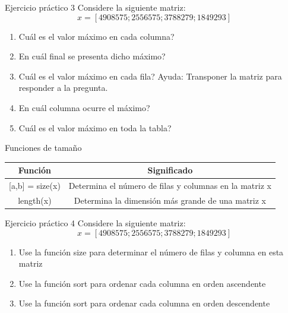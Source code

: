 \documentclass{bredelebeamer}
\begin{document}
\begin{frame}{Ejercicio práctico 3}
Considere la siguiente matriz:
\begin{equation*}
x = [4 90 85 75 ; 2 55 65 75 ; 3 78 82 79 ; 1 84 92 93]
\end{equation*}
\begin{enumerate}
\item Cuál es el valor máximo en cada columna?
\item En cuál final se presenta dicho máximo?
\item Cuál es el valor máximo en cada fila? Ayuda: Transponer la matriz para responder a la pregunta.
\item En cuál columna ocurre el máximo?
\item Cuál es el valor máximo en toda la tabla?
\end{enumerate}
\end{frame}

\begin{frame}{Funciones de tamaño}
\begin{table}[]
\centering
\begin{tabular}{|c|c|}
\hline
Función             & Significado                                            \\ \hline
{[}a,b{]} = size(x) & Determina el número de filas y columnas en la matriz x \\ \hline
length(x)           & Determina la dimensión más grande de una matriz x      \\ \hline
\end{tabular}
\end{table}
\end{frame}

\begin{frame}{Ejercicio práctico 4}
Considere la siguiente matriz:
\begin{equation*}
x = [4 90 85 75 ; 2 55 65 75 ; 3 78 82 79 ; 1 84 92 93]
\end{equation*}
\begin{enumerate}
\item Use la función size para determinar el número de filas y columna en esta matriz
\item Use la función sort para ordenar cada columna en orden ascendente
\item Use la función sort para ordenar cada columna en orden descendente
\end{enumerate}
\end{frame}

\end{document}
